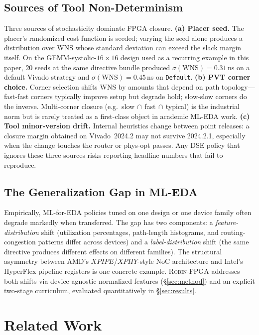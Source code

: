 \documentclass[journal,onecolumn=false]{IEEEtran}
\begin{document}
\subsection{Sources of Tool Non-Determinism}
Three sources of stochasticity dominate FPGA closure.
\textbf{(a) Placer seed.} The placer's randomized cost function is seeded; varying the seed alone produces a distribution over WNS whose standard deviation can exceed the slack margin itself. On the GEMM-systolic-$16{\times}16$ design used as a recurring example in this paper, $20$ seeds at the same directive bundle produced $\sigma(\mathrm{WNS}) = 0.31$\,ns on a default Vivado strategy and $\sigma(\mathrm{WNS}) = 0.45$\,ns on \texttt{Default}.
\textbf{(b) PVT corner choice.} Corner selection shifts WNS by amounts that depend on path topology---fast-fast corners typically improve setup but degrade hold; slow-slow corners do the inverse. Multi-corner closure (e.g.\ slow$\,\cap\,$fast$\,\cap\,$typical) is the industrial norm but is rarely treated as a first-class object in academic ML-EDA work.
\textbf{(c) Tool minor-version drift.} Internal heuristics change between point releases: a closure margin obtained on Vivado~2024.2 may not survive 2024.2.1, especially when the change touches the router or phys-opt passes. Any DSE policy that ignores these three sources risks reporting headline numbers that fail to reproduce.

\subsection{The Generalization Gap in ML-EDA}
Empirically, ML-for-EDA policies tuned on one design or one device family often degrade markedly when transferred. The gap has two components: a \emph{feature-distribution} shift (utilization percentages, path-length histograms, and routing-congestion patterns differ across devices) and a \emph{label-distribution} shift (the same directive produces different effects on different families). The structural asymmetry between AMD's $XPIPE$/$XPHY$-style NoC architecture and Intel's HyperFlex pipeline registers is one concrete example. \textsc{Robin-FPGA} addresses both shifts via device-agnostic normalized features (\S\ref{sec:method}) and an explicit two-stage curriculum, evaluated quantitatively in \S\ref{sec:results}.

\section{Related Work}
\label{sec:related}
\end{document}
